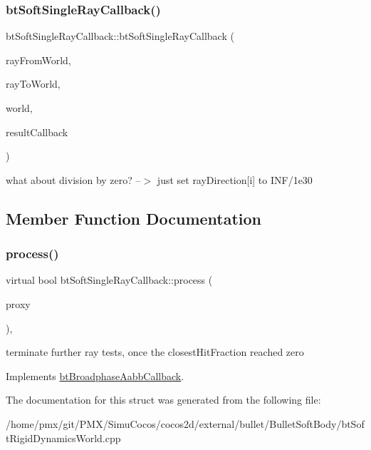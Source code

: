 \subsubsection{\texorpdfstring{bt\+Soft\+Single\+Ray\+Callback()}{btSoftSingleRayCallback()}}
{\footnotesize\ttfamily bt\+Soft\+Single\+Ray\+Callback\+::bt\+Soft\+Single\+Ray\+Callback (\begin{DoxyParamCaption}\item[{const bt\+Vector3 \&}]{ray\+From\+World,  }\item[{const bt\+Vector3 \&}]{ray\+To\+World,  }\item[{const \hyperlink{classbtSoftRigidDynamicsWorld}{bt\+Soft\+Rigid\+Dynamics\+World} $\ast$}]{world,  }\item[{\hyperlink{structbtCollisionWorld_1_1RayResultCallback}{bt\+Collision\+World\+::\+Ray\+Result\+Callback} \&}]{result\+Callback }\end{DoxyParamCaption})\hspace{0.3cm}{\ttfamily [inline]}}

what about division by zero? --$>$ just set ray\+Direction\mbox{[}i\mbox{]} to I\+N\+F/1e30 

\subsection{Member Function Documentation}
\mbox{\label{structbtSoftSingleRayCallback_a9625cb3d48cfe194f1af2b52c4cf90cd}} 
\subsubsection{\texorpdfstring{process()}{process()}}
{\footnotesize\ttfamily virtual bool bt\+Soft\+Single\+Ray\+Callback\+::process (\begin{DoxyParamCaption}\item[{const bt\+Broadphase\+Proxy $\ast$}]{proxy }\end{DoxyParamCaption})\hspace{0.3cm}{\ttfamily [inline]}, {\ttfamily [virtual]}}

terminate further ray tests, once the closest\+Hit\+Fraction reached zero 

Implements \hyperlink{structbtBroadphaseAabbCallback}{bt\+Broadphase\+Aabb\+Callback}.



The documentation for this struct was generated from the following file\+:\begin{DoxyCompactItemize}
\item 
/home/pmx/git/\+P\+M\+X/\+Simu\+Cocos/cocos2d/external/bullet/\+Bullet\+Soft\+Body/bt\+Soft\+Rigid\+Dynamics\+World.\+cpp\end{DoxyCompactItemize}
